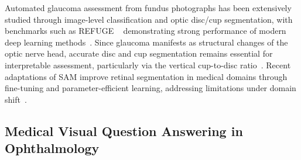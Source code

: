 \documentclass[runningheads]{llncs}
\begin{document}

Automated glaucoma assessment from fundus photographs has been extensively studied through image-level classification and optic disc/cup segmentation, with benchmarks such as \gls{REFUGE} ~\cite{orlando2020refuge} demonstrating strong performance of modern deep learning methods~\cite{meedeniya2025glaucoma}. Since glaucoma manifests as structural changes of the optic nerve head, accurate disc and cup segmentation remains essential for interpretable assessment, particularly via the vertical cup-to-disc ratio~\cite{song2024odoc}. Recent adaptations of \gls{SAM} improve retinal segmentation in medical domains through fine-tuning and parameter-efficient learning, addressing limitations under domain shift~\cite{huang2024sam_medical,zhang2024sam_survey}.

\subsection{Medical Visual Question Answering in Ophthalmology}
\label{subsec:medvqa}
\end{document}
